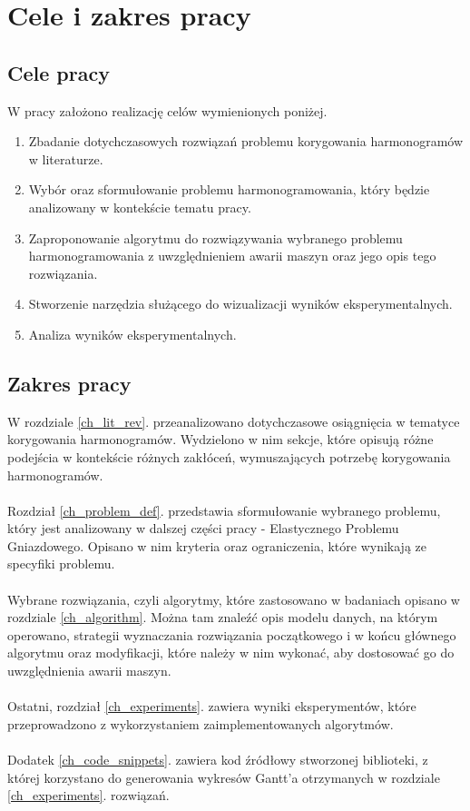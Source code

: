 \documentclass[printmode,oneside]{mgr}
\begin{document}
\chapter*{Cele i zakres pracy}
\section*{Cele pracy}
W pracy założono realizację celów wymienionych poniżej.
\begin{enumerate}
	\item Zbadanie dotychczasowych rozwiązań problemu korygowania harmonogramów w literaturze.
	\item Wybór oraz sformułowanie problemu harmonogramowania, który będzie analizowany w kontekście tematu pracy.
	\item Zaproponowanie algorytmu do rozwiązywania wybranego problemu harmonogramowania z uwzględnieniem awarii maszyn oraz jego opis tego rozwiązania.
	\item Stworzenie narzędzia służącego do wizualizacji wyników eksperymentalnych.
	\item Analiza wyników eksperymentalnych.
\end{enumerate}
\section*{Zakres pracy}
W rozdziale \ref{ch_lit_rev}. przeanalizowano dotychczasowe osiągnięcia w tematyce korygowania harmonogramów. Wydzielono w nim sekcje, które opisują różne podejścia w kontekście różnych zakłóceń, wymuszających potrzebę korygowania harmonogramów.\\\\
Rozdział \ref{ch_problem_def}. przedstawia sformułowanie wybranego problemu, który jest analizowany w dalszej części pracy - Elastycznego Problemu Gniazdowego. Opisano w nim kryteria oraz ograniczenia, które wynikają ze specyfiki problemu.\\\\
Wybrane rozwiązania, czyli algorytmy, które zastosowano w badaniach opisano w rozdziale \ref{ch_algorithm}. Można tam znaleźć opis modelu danych, na którym operowano, strategii wyznaczania rozwiązania początkowego i w końcu głównego algorytmu oraz modyfikacji, które należy w nim wykonać, aby dostosować go do uwzględnienia awarii maszyn.\\\\
Ostatni, rozdział \ref{ch_experiments}. zawiera wyniki eksperymentów, które przeprowadzono z wykorzystaniem zaimplementowanych algorytmów.\\\\
Dodatek \ref{ch_code_snippets}. zawiera kod źródłowy stworzonej biblioteki, z której korzystano do generowania wykresów Gantt'a otrzymanych w rozdziale \ref{ch_experiments}. rozwiązań.
%
\end{document}

